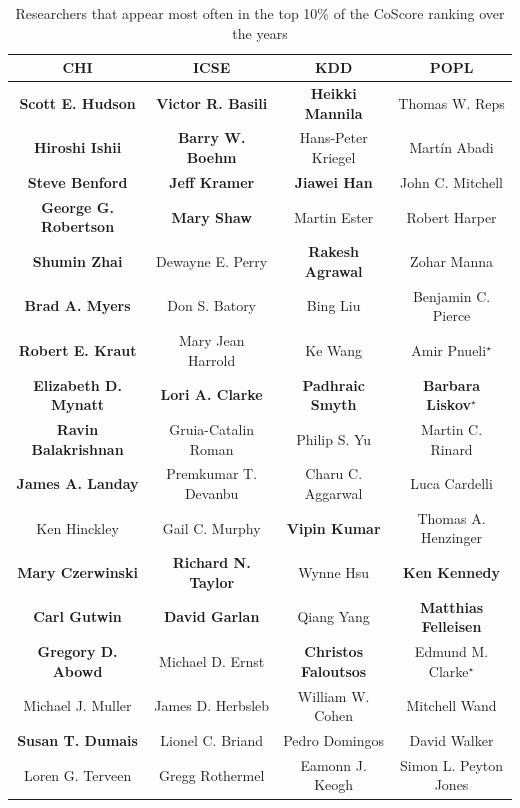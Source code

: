 \documentclass{sig-alternate-10pt}
\begin{document}
\begin{table}[t]
\centering
\caption{Researchers that appear most often in the top 10\% of the CoScore ranking over the years}{
\begin{scriptsize}
\begin{tabular}{|c|c|c|c|} \hline
\textbf{CHI} & \textbf{ICSE} & \textbf{KDD} & \textbf{POPL}\\ \hline
\textbf{Scott E. Hudson} & \textbf{Victor R. Basili} & \textbf{Heikki Mannila} & Thomas W. Reps\\ \hline
\textbf{Hiroshi Ishii} & \textbf{Barry W. Boehm} & Hans-Peter Kriegel & Martín Abadi\\ \hline
\textbf{Steve Benford} & \textbf{Jeff Kramer} & \textbf{Jiawei Han} & John C. Mitchell\\ \hline
\textbf{George G. Robertson} & \textbf{Mary Shaw} & Martin Ester & Robert Harper\\ \hline
\textbf{Shumin Zhai} & Dewayne E. Perry & \textbf{Rakesh Agrawal} & Zohar Manna\\ \hline
\textbf{Brad A. Myers} & Don S. Batory & Bing Liu & Benjamin C. Pierce\\ \hline
\textbf{Robert E. Kraut} & Mary Jean Harrold & Ke Wang & Amir Pnueli$^\star$\\ \hline
\textbf{Elizabeth D. Mynatt} & \textbf{Lori A. Clarke} & \textbf{Padhraic Smyth} & \textbf{Barbara Liskov}$^\star$\\ \hline
\textbf{Ravin Balakrishnan} & Gruia-Catalin Roman & Philip S. Yu & Martin C. Rinard\\ \hline
\textbf{James A. Landay} & Premkumar T. Devanbu & Charu C. Aggarwal & Luca Cardelli\\ \hline
Ken Hinckley & Gail C. Murphy & \textbf{Vipin Kumar} & Thomas A. Henzinger\\ \hline
\textbf{Mary Czerwinski} & \textbf{Richard N. Taylor} & Wynne Hsu & \textbf{Ken Kennedy}\\ \hline
\textbf{Carl Gutwin} & \textbf{David Garlan} & Qiang Yang & \textbf{Matthias Felleisen}\\ \hline
\textbf{Gregory D. Abowd} & Michael D. Ernst & \textbf{Christos Faloutsos} & Edmund M. Clarke$^\star$\\ \hline
Michael J. Muller & James D. Herbsleb & William W. Cohen & Mitchell Wand\\ \hline
\textbf{Susan T. Dumais} & Lionel C. Briand & Pedro Domingos & David Walker\\ \hline
Loren G. Terveen & Gregg Rothermel & Eamonn J. Keogh & Simon L. Peyton Jones\\ \hline

\end{tabular}
\end{scriptsize}}
\end{table}
\end{document}
